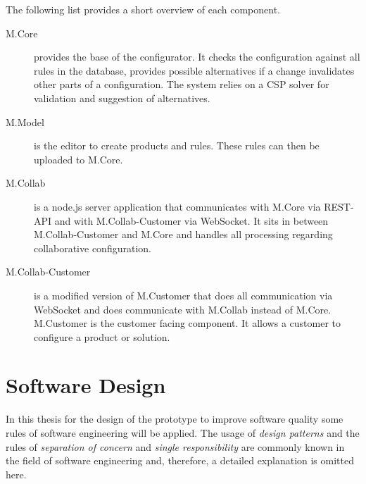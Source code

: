 The following list provides a short overview of each component.

\begin{description}
    \item[M.Core] provides the base of the configurator. It checks the configuration against all rules in the database, provides possible alternatives if a change invalidates other parts of a configuration. The system relies on a CSP solver for validation and suggestion of alternatives.
    \item[M.Model] is the editor to create products and rules. These rules can then be uploaded to M.Core.
    \item[M.Collab] is a node.js server application that communicates with M.Core via REST-API and with M.Collab-Customer via WebSocket. It sits in between M.Collab-Customer and M.Core and handles all processing regarding collaborative configuration.
    \item[M.Collab-Customer] is a modified version of M.Customer that does all communication via WebSocket and does communicate with M.Collab instead of M.Core. M.Customer is the customer facing component. It allows a customer to configure a product or solution.
\end{description}

\section{Software Design}
\label{sec:Foundations:BaseSystem}

In this thesis for the design of the prototype to improve software quality some rules of software engineering will be applied. The usage of \emph{design patterns} \cite{gamma2015design} and the rules of \emph{separation of concern} \cite{de2002importance} and \emph{single responsibility} \cite{martinCleanArchitectureCraftsman2017} are commonly known in the field of software engineering and, therefore, a detailed explanation is omitted here.


